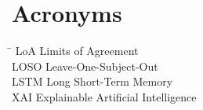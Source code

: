 \chapter*{Acronyms}
\begin{tabbing}
\hspace{3.5cm}\= \kill
LoA \> Limits of Agreement \\
LOSO \> Leave-One-Subject-Out \\
LSTM \> Long Short-Term Memory \\
XAI \> Explainable Artificial Intelligence \\
\end{tabbing}
\clearpage
